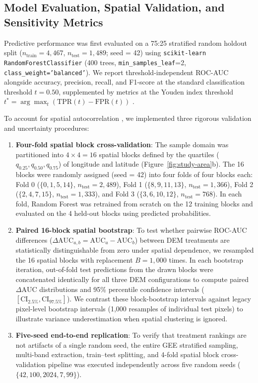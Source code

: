 \documentclass[11pt,twoside]{article}
\begin{document}
\subsection{Model Evaluation, Spatial Validation, and Sensitivity Metrics}\label{subsec:evaluation-protocol}

Predictive performance was first evaluated on a 75:25 stratified random holdout split ($n_{\text{train}} = 4{,}467$, $n_{\text{test}} = 1{,}489$; seed = 42) using \texttt{scikit-learn} \texttt{RandomForestClassifier} (400 trees, \texttt{min\_samples\_leaf}=2, \texttt{class\_weight='balanced'}). We report threshold-independent ROC-AUC alongside accuracy, precision, recall, and F1-score at the standard classification threshold $t = 0.50$, supplemented by metrics at the Youden index threshold $t^* = \arg\max_t(\text{TPR}(t) - \text{FPR}(t))$ \cite{youden1950}.

To account for spatial autocorrelation \cite{roberts2017,ploton2020}, we implemented three rigorous validation and uncertainty procedures:
\begin{enumerate}
\item \textbf{Four-fold spatial block cross-validation}: The sample domain was partitioned into $4 \times 4 = 16$ spatial blocks defined by the quartiles ($q_{0.25}, q_{0.50}, q_{0.75}$) of longitude and latitude (Figure~\ref{fig:study-area}b). The 16 blocks were randomly assigned (seed = 42) into four folds of four blocks each: Fold 0 ($\{0, 1, 5, 14\}$, $n_{\text{test}}=2{,}489$), Fold 1 ($\{8, 9, 11, 13\}$, $n_{\text{test}}=1{,}366$), Fold 2 ($\{2, 4, 7, 15\}$, $n_{\text{test}}=1{,}333$), and Fold 3 ($\{3, 6, 10, 12\}$, $n_{\text{test}}=768$). In each fold, Random Forest was retrained from scratch on the 12 training blocks and evaluated on the 4 held-out blocks using predicted probabilities.
\item \textbf{Paired 16-block spatial bootstrap}: To test whether pairwise ROC-AUC differences ($\Delta\text{AUC}_{a,b} = \text{AUC}_a - \text{AUC}_b$) between DEM treatments are statistically distinguishable from zero under spatial dependence, we resampled the 16 spatial blocks with replacement $B = 1{,}000$ times. In each bootstrap iteration, out-of-fold test predictions from the drawn blocks were concatenated identically for all three DEM configurations to compute paired $\Delta\text{AUC}$ distributions and 95\% percentile confidence intervals ($[\text{CI}_{2.5\%}, \text{CI}_{97.5\%}]$). We contrast these block-bootstrap intervals against legacy pixel-level bootstrap intervals (1,000 resamples of individual test pixels) to illustrate variance underestimation when spatial clustering is ignored.
\item \textbf{Five-seed end-to-end replication}: To verify that treatment rankings are not artifacts of a single random seed, the entire GEE stratified sampling, multi-band extraction, train--test splitting, and 4-fold spatial block cross-validation pipeline was executed independently across five random seeds ($\{42, 100, 2024, 7, 99\}$).
\end{enumerate}
\end{document}
